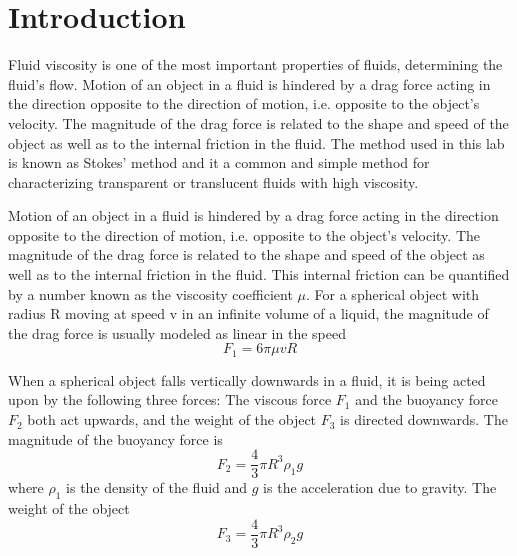 \section{Introduction}
Fluid viscosity is one of the most important properties of fluids, determining
the fluid’s flow. 
Motion of an object in a fluid is hindered by a drag force acting in the
direction opposite to the direction of motion, i.e. opposite to the object’s
velocity. 
The magnitude of the drag force is related to the shape and speed of the object
as well as to the internal friction in the fluid.
The method used in this lab is known as Stokes’ method and it a common and
simple method for characterizing transparent or translucent fluids with high
viscosity.


Motion of an object in a fluid is hindered by a drag force acting in the
direction opposite to the direction of motion, i.e. opposite to the object’s
velocity. 
The magnitude of the drag force is related to the shape and speed of the object
as well as to the internal friction in the fluid.
This internal friction can be quantified by a number known as the viscosity
coefficient $\mu$.
For a spherical object with radius R moving at speed v in an infinite volume of
a liquid, the magnitude of the drag force is usually modeled as linear in the
speed
$$  F_1 = 6 \pi \mu v R  $$

When a spherical object falls vertically downwards in a fluid, it is being acted
upon by the following three forces:
The viscous force \emph{$F_1$} and the buoyancy force \emph{$F_2$} both act
upwards, and the weight of the object \emph{$F_3$} is directed downwards.
The magnitude of the buoyancy force is
$$  F_2 = \frac{4}{3} \pi R^3 \rho_1 g $$
where $\rho_1$ is the density of the fluid and $g$ is the acceleration due to
gravity. The weight of the object
$$  F_3 = \frac{4}{3} \pi R^3 \rho_2 g $$




